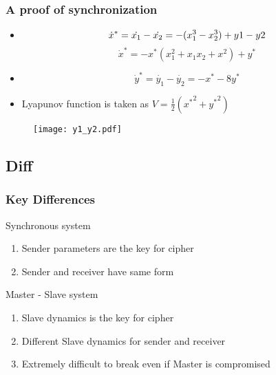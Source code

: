 \documentclass[xcolor=dvipsnames]{beamer}
\begin{document}
\begin{frame}
\frametitle{A proof of synchronization}
\begin{itemize}
\item
\begin{equation*}
\dot{x}^{\ast} = \dot{x_1} - \dot{x_2} = - (x_1^3 - x_2^3 ) + y1 - y2
\newline
\end{equation*}
\begin{equation*}
\dot{x}^{\ast} = -x^{\ast} (x_1^2 + x_1 x_2 + x^2) + y^{\ast}
\end{equation*}
\item
\begin{equation*}
\dot{y}^{\ast} = \dot{y_1} - \dot{y_2} = - x^{\ast} - 8 y^{\ast}
\end{equation*}
\vspace{0.05in}
\item
\alert{Lyapunov function} is taken as $V = \frac{1}{2}({x^{\ast}}^2 + {y^{\ast}}^2 )$
\end{itemize}

\begin{figure}
\centering
\texttt{[image: y1\_y2.pdf]}
\end{figure}
\end{frame}

\subsection*{Diff}
\begin{frame}
\frametitle{Key Differences}
\begin{block}{Synchronous system}
\end{block}
\begin{enumerate}
\item
Sender \alert{parameters} are the key for cipher
\vspace{0.05in}
\item
Sender and receiver have \alert{same form}
\vspace{0.05in}
\end{enumerate}
\begin{block}{Master - Slave system}
\end{block}
\begin{enumerate}
\item
\alert{Slave dynamics} is the key for cipher
\vspace{0.05in}
\item
Different Slave dynamics for sender and receiver
\vspace{0.05in}
\item
Extremely difficult to break even if Master is compromised
\end{enumerate}
\end{frame}
\end{document}
